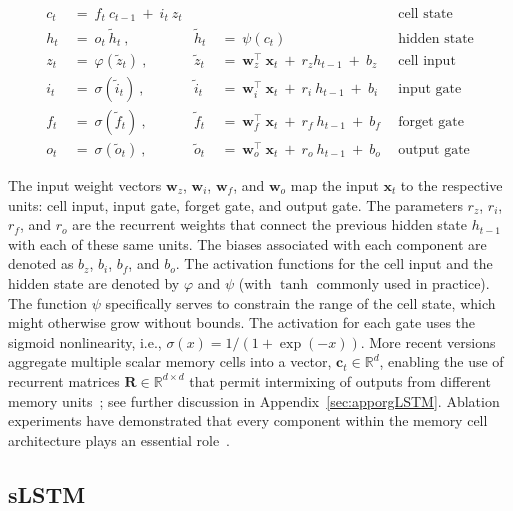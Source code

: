 \begin{align}
c_t \ &= \  f_t \ c_{t-1} \ + \ i_t \ z_t &  & &\text{cell state} \\
h_t  \ &= \ o_t \ \tilde{h}_t \ , & \tilde{h}_t \ &= \ \psi \left( c_t\right)
  &\text{hidden state} \\
z_t \ &= \ \varphi \left( \tilde{z}_t \right) \ , 
  &\tilde{z}_t \ &=  \ \mathbf{w}^\top_{z} \ \mathbf{x}_t \ + \
  r_{z}  h_{t-1} \ + \  b_{z} \ \
  &\text{cell input} \\
i_t \ &= \ \sigma \left( \tilde{i}_t  \right) \ , 
  &\tilde{i}_t \ &= \ \mathbf{w}^\top_{i} \ \mathbf{x}_t \ + \
  r_{i}  \ h_{t-1} \ + \  b_{i} \ \
  &\text{input gate} \\
f_t \ &= \ \sigma \left(  \tilde{f}_t \right) \ , 
  &\tilde{f}_t \ &= \ \mathbf{w}^\top_{f} \ \mathbf{x}_t  \ + \
  r_{f}  \ h_{t-1} \ + \  b_{f} \ \
  &\text{forget gate} \\
o_t \ &= \ \sigma \left( \tilde{o}_t \right) \ , 
  &\tilde{o}_t  \ &= \ \mathbf{w}^\top_{o} \ \mathbf{x}_t \ + \
  r_{o}  \ h_{t-1} \ + \  b_{o} \ \
  &\text{output gate} 
\end{align}

The input weight vectors $\mathbf{w}_{z}$, $\mathbf{w}_{i}$, $\mathbf{w}_{f}$, and $\mathbf{w}_{o}$ map the input $\mathbf{x}_t$ to the respective units: cell input, input gate, forget gate, and output gate. The parameters $r_{z}$, $r_{i}$, $r_{f}$, and $r_{o}$ are the recurrent weights that connect the previous hidden state $h_{t-1}$ with each of these same units. The biases associated with each component are denoted as $b_{z}$, $b_{i}$, $b_{f}$, and $b_{o}$. The activation functions for the cell input and the hidden state are denoted by $\varphi$ and $\psi$ (with $\tanh$ commonly used in practice). The function $\psi$ specifically serves to constrain the range of the cell state, which might otherwise grow without bounds. The activation for each gate uses the sigmoid nonlinearity, i.e., $\sigma(x) = 1/(1+\exp(-x))$. More recent versions aggregate multiple scalar memory cells into a vector, $\mathbf{c}_t \in \mathbb{R}^{d}$, enabling the use of recurrent matrices $\mathbf{R} \in \mathbb{R}^{d \times d}$ that permit intermixing of outputs from different memory units~\citep{Greff:15}; see further discussion in Appendix~\ref{sec:apporgLSTM}. Ablation experiments have demonstrated that every component within the memory cell architecture plays an essential role~\citep{Greff:15}.

\subsection{sLSTM}
\label{sec:sLSTM}

